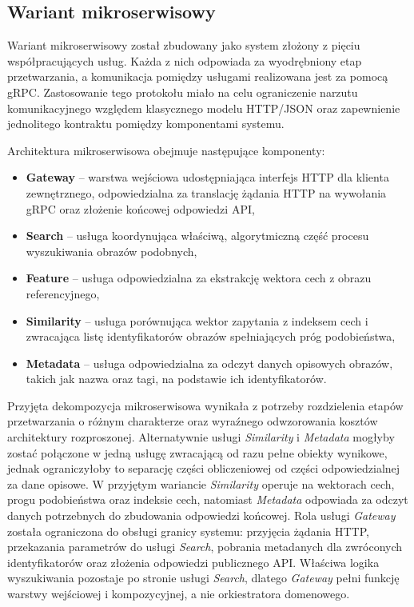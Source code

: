 \subsection{Wariant mikroserwisowy}

Wariant mikroserwisowy został zbudowany jako system złożony z pięciu współpracujących usług. Każda z nich odpowiada za wyodrębniony etap przetwarzania, a komunikacja pomiędzy usługami realizowana jest za pomocą gRPC. Zastosowanie tego protokołu miało na celu ograniczenie narzutu komunikacyjnego względem klasycznego modelu HTTP/JSON oraz zapewnienie jednolitego kontraktu pomiędzy komponentami systemu.

Architektura mikroserwisowa obejmuje następujące komponenty:
\begin{itemize}
    \item \textbf{Gateway} -- warstwa wejściowa udostępniająca interfejs HTTP dla klienta zewnętrznego, odpowiedzialna za translację żądania HTTP na wywołania gRPC oraz złożenie końcowej odpowiedzi API,
    \item \textbf{Search} -- usługa koordynująca właściwą, algorytmiczną część procesu wyszukiwania obrazów podobnych,
    \item \textbf{Feature} -- usługa odpowiedzialna za ekstrakcję wektora cech z obrazu referencyjnego,
    \item \textbf{Similarity} -- usługa porównująca wektor zapytania z indeksem cech i zwracająca listę identyfikatorów obrazów spełniających próg podobieństwa,
    \item \textbf{Metadata} -- usługa odpowiedzialna za odczyt danych opisowych obrazów, takich jak nazwa oraz tagi, na podstawie ich identyfikatorów.
\end{itemize}

Przyjęta dekompozycja mikroserwisowa wynikała z potrzeby rozdzielenia etapów przetwarzania o różnym charakterze oraz wyraźnego odwzorowania kosztów architektury rozproszonej. Alternatywnie usługi \textit{Similarity} i \textit{Metadata} mogłyby zostać połączone w jedną usługę zwracającą od razu pełne obiekty wynikowe, jednak ograniczyłoby to separację części obliczeniowej od części odpowiedzialnej za dane opisowe. W przyjętym wariancie \textit{Similarity} operuje na wektorach cech, progu podobieństwa oraz indeksie cech, natomiast \textit{Metadata} odpowiada za odczyt danych potrzebnych do zbudowania odpowiedzi końcowej. Rola usługi \textit{Gateway} została ograniczona do obsługi granicy systemu: przyjęcia żądania HTTP, przekazania parametrów do usługi \textit{Search}, pobrania metadanych dla zwróconych identyfikatorów oraz złożenia odpowiedzi publicznego API. Właściwa logika wyszukiwania pozostaje po stronie usługi \textit{Search}, dlatego \textit{Gateway} pełni funkcję warstwy wejściowej i kompozycyjnej, a nie orkiestratora domenowego.

